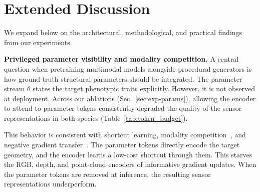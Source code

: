 \documentclass[10pt,twocolumn,letterpaper]{article}
\begin{document}
\section{Extended Discussion}
\label{app:discussion}

We expand below on the architectural, methodological, and practical findings from our experiments.

\noindent\textbf{Privileged parameter visibility and modality competition.}
A central question when pretraining multimodal models alongside procedural generators is how ground-truth structural parameters should be integrated. The parameter stream $\theta$ states the target phenotypic traits explicitly. However, it is not observed at deployment. Across our ablations (Sec.~\ref{sec:exp-params}), allowing the encoder to attend to parameter tokens consistently degraded the quality of the sensor representations in both species (Table~\ref{tab:token_budget}).

This behavior is consistent with shortcut learning, modality competition~\citep{peng2022ogm}, and negative gradient transfer~\citep{yu2020pcgrad}. The parameter tokens directly encode the target geometry, and the encoder learns a low-cost shortcut through them. This starves the RGB, depth, and point-cloud encoders of informative gradient updates. When the parameter tokens are removed at inference, the resulting sensor representations underperform.
\end{document}
